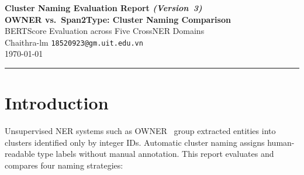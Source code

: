 \documentclass[11pt,a4paper]{article}
\begin{document}
\begin{center}
  {\LARGE\bfseries\color{ownerblue}
    Cluster Naming Evaluation Report \normalsize\textit{(Version~3)}\\[0.4em]
    \large OWNER vs.\ Span2Type: Cluster Naming Comparison}\\[0.8em]
  {\large BERTScore Evaluation across Five CrossNER Domains}\\[0.6em]
  {\normalsize Chaithra-lm \quad \texttt{18520923@gm.uit.edu.vn}}\\[0.3em]
  {\small \today}
\end{center}
\vspace{0.4em}\hrule\vspace{1.2em}

\begin{abstract}
This report compares four cluster-naming methods across five CrossNER domains
(AI, Literature, Music, Politics, Science), evaluated using BERTScore
(RoBERTa-large) against ground-truth entity type labels.
Two methods belong to \textbf{OWNER}: BERT-based naming (MLM top-1 vote)
and LLM-based naming (Llama-3.1-8B via Ollama, Figure~3 prompt, $n{=}16$).
Two methods belong to \textbf{Span2Type}: MLM-based naming (same BERT voting
strategy) and Ollama-based naming (Llama-3.1-8B with richer context prompting).
OWNER-BERT and Span2Type-MLM produce \textbf{identical} F$_1$ scores (0.966)
since they share the same underlying approach.
Span2Type-Ollama achieves a higher average F$_1$ of \textbf{0.952} compared
to OWNER-LLM's \textbf{0.944}, driven by more descriptive multi-word names.
\end{abstract}

\section{Introduction}

Unsupervised NER systems such as OWNER~\cite{genest2025owner} group extracted
entities into clusters identified only by integer IDs.
Automatic cluster naming assigns human-readable type labels without manual
annotation. This report evaluates and compares four naming strategies:
\end{document}
